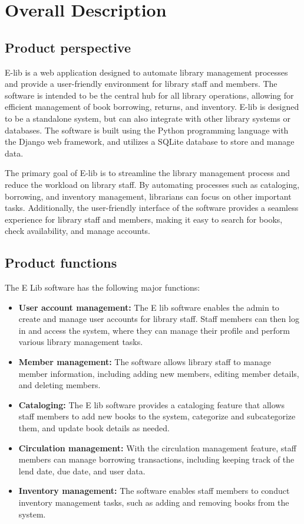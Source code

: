 \chapter{Overall Description}
\label{ch:overall description}

\section{Product perspective}
E-lib is a web application designed to automate library management processes and provide a user-friendly environment for library staff and members. The software is intended to be the central hub for all library operations, allowing for efficient management of book borrowing, returns, and inventory. E-lib is designed to be a standalone system, but can also integrate with other library systems or databases. The software is built using the Python programming language with the Django web framework, and utilizes a SQLite database to store and manage data.

The primary goal of E-lib is to streamline the library management process and reduce the workload on library staff. By automating processes such as cataloging, borrowing, and inventory management, librarians can focus on other important tasks. Additionally, the user-friendly interface of the software provides a seamless experience for library staff and members, making it easy to search for books, check availability, and manage accounts.


\section{Product functions}

The E Lib software has the following major functions:

\begin{itemize}
    \item \textbf{User account management: }  The E lib software enables the admin to create and manage user accounts for library staff. Staff members can then log in and access the system, where they can manage their profile and perform various library management tasks.
    \item \textbf{Member management: }  The software allows library staff to manage member information, including adding new members, editing member details, and deleting members.
    \item \textbf{Cataloging:  } The E lib software provides a cataloging feature that allows staff members to add new books to the system, categorize and subcategorize them, and update book details as needed.
    \item \textbf{Circulation management:}  With the circulation management feature, staff members can manage borrowing transactions, including keeping track of the lend date, due date, and user data.
    \item \textbf{Inventory management:} The software enables staff members to conduct inventory management tasks, such as adding and removing books from the system.

\end{itemize}

